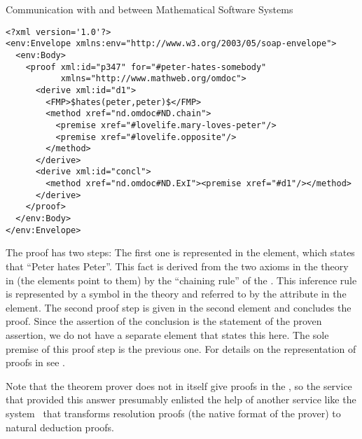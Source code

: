 \begin{tchapter}[id=rpc,short=Communication between Systems]{Communication with and between Mathematical Software Systems}
\begin{lstlisting}[label=lst:rpc-proof,mathescape,
  caption={A proof that Peter hates someone}]
<?xml version='1.0'?>
<env:Envelope xmlns:env="http://www.w3.org/2003/05/soap-envelope">
  <env:Body>
    <proof xml:id="p347" for="#peter-hates-somebody"
           xmlns="http://www.mathweb.org/omdoc"> 
      <derive xml:id="d1">
        <FMP>$hates(peter,peter)$</FMP>
        <method xref="nd.omdoc#ND.chain">
          <premise xref="#lovelife.mary-loves-peter"/>
          <premise xref="#lovelife.opposite"/>
        </method>
      </derive>
      <derive xml:id="concl">
        <method xref="nd.omdoc#ND.ExI"><premise xref="#d1"/></method>
      </derive>
    </proof>
  </env:Body>
</env:Envelope>
\end{lstlisting} 
The proof has two steps: The first one is represented in the {} element,
which states that ``Peter hates Peter''. This fact is derived from the two axioms in the
theory {} in {} (the {} elements
point to them) by the ``chaining rule'' of the
{}. This inference rule is represented by a symbol
in the theory {} and referred to by the {} attribute
in the {} element.  The second proof step is given in the second
{} element and concludes the proof. Since the assertion of the conclusion
is the statement of the proven assertion, we do not have a separate {}
element that states this here. The sole premise of this proof step is the previous one.
For details on the representation of proofs in {\omdoc} see {}.

Note that the {\spass} theorem prover does not in itself give proofs in the
{}, so the {\spass} service that provided this
answer presumably enlisted the help of another {\mathwebws} service like the {\tramp}
system~\cite{Meier:sdttom00} that transforms resolution proofs (the native format of the
{\spass} prover) to natural deduction proofs.
\end{tchapter}


